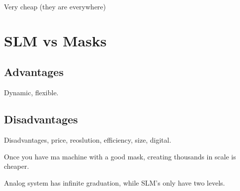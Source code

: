 \documentclass[../main/main.tex]{subfiles}
\begin{document}
Very cheap (they are everywhere)

\section{ SLM vs Masks}

\subsection{Advantages}
Dynamic, flexible.

\subsection{Disadvantages}
Disadvantages, price, reoslution, efficiency, size, digital.

Once you have ma machine with a good mask, creating thousands in scale is cheaper.

Analog system has infinite graduation, while SLM's only have two levels.
\end{document}

